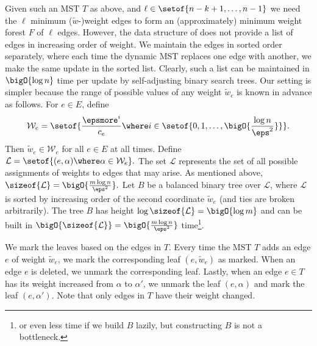 \documentclass[11pt]{article}
\numberwithin{equation}{section}
\theoremstyle{definition}
\theoremstyle{plain}
\newcommand{\costof}[1]{c_{#1}}
\newcommand{\weights}[1]{\mathcal{W}_{#1}} %
\newcommand{\leaves}{\mathcal{L}} %
\newcommand{\apxweight}{\tilde{w}}%
\newcommand{\apxweightof}[1]{\apxweight_{#1}}%
\begin{document}
Given such an MST $T$ as above, and
\begin{math}
  \ell \in \setof{n - k+1,\dots,n-1}
\end{math}
we need the $\ell$ minimum ($\apxweight$-)weight edges to form an
(approximately) minimum weight forest $F$ of $\ell$ edges. However,
the data structure of  does not provide a list
of edges in increasing order of weight. We maintain the edges in
sorted order separately, where each time the dynamic MST replaces one
edge with another, we make the same update in the sorted
list. Clearly, such a list can be maintained in $\bigO{\log n}$ time
per update by self-adjusting binary search trees. Our setting is
simpler because the range of possible values of any weight
$\apxweightof{e}$ is known in advance as follows.  For $e \in E$, define
\begin{align*}
  \weights{e} =                 %
  \setof{                       %
  \frac{\epsmore^i}{\costof{e}}   %
  \where                        %
  i \in
  \setof{0,1,\dots,\bigO{\frac{\log n}{\eps^2}}} %
  }.
\end{align*}
Then $\apxweightof{e} \in \weights{e}$ for all $e \in E$ at all
times. Define
\begin{math}
  \leaves = \setof{ (e,\alpha) \where \alpha \in \weights{e}}.
\end{math}
The set $\leaves$ represents the set of all possible assignments of
weights to edges that may arise. As mentioned above,
\begin{math}
  \sizeof{\leaves} = \bigO{\frac{m \log n}{\eps^2}}.
\end{math}
Let $B$ be a balanced binary tree over $\leaves$, where $\leaves$ is
sorted by increasing order of the second coordinate $\apxweightof{e}$
(and ties are broken arbitrarily). The tree $B$ has height
$\log \sizeof{\leaves} = \bigO{\log m}$ and can be built in
$\bigO{\sizeof{\leaves}} = \bigO{\frac{m \log n}{\eps^2}}$
time\footnote{or even less time if we build $B$ lazily, but
  constructing $B$ is not a bottleneck.}.

We mark the leaves based on the edges in $T$.  Every time the MST $T$
adds an edge $e$ of weight $\apxweightof{e}$, we mark the corresponding
leaf $(e,\apxweightof{e})$ as marked. When an edge $e$ is deleted, we
unmark the corresponding leaf. Lastly, when an edge $e \in T$ has its
weight increased from $\alpha$ to $\alpha'$, we unmark the leaf
$(e,\alpha)$ and mark the leaf $(e,\alpha')$. Note that only edges in
$T$ have their weight changed.
\end{document}
